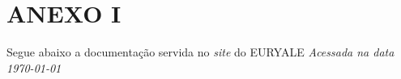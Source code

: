 \documentclass[
	12pt,				%
	oneside,			%
	a4paper,			%
	chapter=TITLE,		%
	section=TITLE,		%
	english,			%
	brazil				%
	]{abntex2}
\begin{document}
\postextual

\begingroup

\printbibliography[title=REFERÊNCIAS]

\endgroup


\chapter{ANEXO I}\label{anexo-i}
\begin{center}
Segue abaixo a documentação servida no \textit{site} do EURYALE
\bigskip\newline
\textit{Acessada na data \today}
\end{center}
\begin{fichacatalografica}
    
\end{fichacatalografica}
%
%

\end{document}
